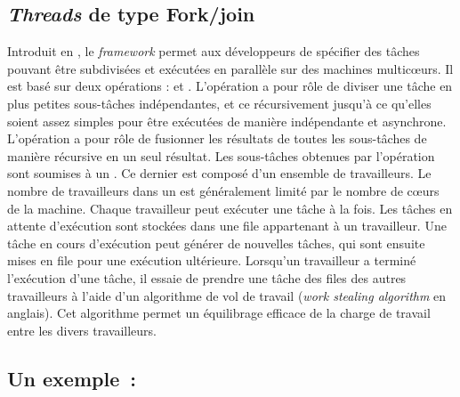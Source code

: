 \subsection{\emph{Threads} de type Fork/join}

Introduit en , le \emph{framework}  permet aux d\'eveloppeurs de sp\'ecifier des t\^aches pouvant \^etre subdivis\'ees et ex\'ecut\'ees en parall\`ele sur des machines multicœurs. Il est bas\'e sur deux op\'erations :  et . L'op\'eration  a pour r\^ole de diviser une t\^ache en plus petites sous-t\^aches ind\'ependantes, et ce  r\'ecursivement jusqu'\`a ce qu'elles soient assez simples pour \^etre ex\'ecut\'ees de mani\`ere ind\'ependante et asynchrone. L'op\'eration  a pour r\^ole de fusionner les r\'esultats de toutes les sous-t\^aches de mani\`ere r\'ecursive en un seul r\'esultat.
Les sous-t\^aches obtenues par l'op\'eration  sont soumises \`a un . Ce dernier est composé d'un ensemble de travailleurs. Le nombre de travailleurs dans un  est g\'en\'eralement limit\'e par le nombre de cœurs de la machine. Chaque travailleur peut ex\'ecuter une t\^ache \`a la fois. Les t\^aches en attente d'ex\'ecution sont stock\'ees dans une file appartenant \`a un travailleur. Une t\^ache en cours d'ex\'ecution peut g\'en\'erer de nouvelles t\^aches, qui sont ensuite mises en file  pour une ex\'ecution ult\'erieure. Lorsqu'un travailleur a termin\'e l'ex\'ecution d'une t\^ache, il essaie de prendre une t\^ache des files des autres travailleurs \`a l'aide d'un algorithme de vol de travail (\emph{work stealing algorithm} en anglais). Cet algorithme permet un \'equilibrage efficace de la charge de travail entre les divers travailleurs.


\subsection{Un exemple~: }


